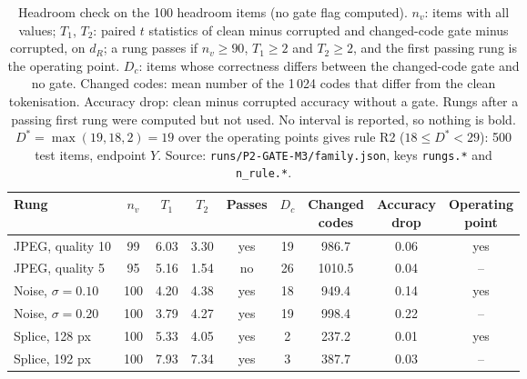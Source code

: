 \begin{table}[!tbp]
\centering
\caption{Headroom check on the 100 headroom items (no gate flag computed). $n_v$: items with all values; $T_1$, $T_2$: paired
$t$ statistics of clean minus corrupted and changed-code gate minus corrupted, on $d_R$; a rung passes if $n_v\ge90$, $T_1\ge2$ and
$T_2\ge2$, and the first passing rung is the operating point. $D_c$: items whose correctness differs between the changed-code gate
and no gate. Changed codes: mean number of the 1\,024 codes that differ from the clean tokenisation. Accuracy drop: clean minus
corrupted accuracy without a gate. Rungs after a passing first rung were computed but not used. No interval is reported, so nothing is
bold. $D^\ast=\max(19,18,2)=19$ over the operating points gives rule R2 ($18\le D^\ast<29$): 500 test items, endpoint $Y$.
Source: \nolinkurl{runs/P2-GATE-M3/family.json}, keys \nolinkurl{rungs.*} and \nolinkurl{n_rule.*}.}
\label{tab:res_headroom}
\footnotesize
\begin{adjustbox}{max width=\textwidth}
\begin{tabular}{lcccccccc}
\toprule
Rung & $n_v$ & $T_1$ & $T_2$ & Passes & $D_c$ & \makecell{Changed\\codes} & \makecell{Accuracy\\drop} & \makecell{Operating\\point} \\
\midrule
JPEG, quality 10 & 99 & 6.03 & 3.30 & yes & 19 & 986.7 & 0.06 & yes \\
JPEG, quality 5 & 95 & 5.16 & 1.54 & no & 26 & 1010.5 & 0.04 & -- \\
Noise, $\sigma=0.10$ & 100 & 4.20 & 4.38 & yes & 18 & 949.4 & 0.14 & yes \\
Noise, $\sigma=0.20$ & 100 & 3.79 & 4.27 & yes & 19 & 998.4 & 0.22 & -- \\
Splice, 128 px & 100 & 5.33 & 4.05 & yes & 2 & 237.2 & 0.01 & yes \\
Splice, 192 px & 100 & 7.93 & 7.34 & yes & 3 & 387.7 & 0.03 & -- \\
\bottomrule
\end{tabular}
\end{adjustbox}
\end{table}

